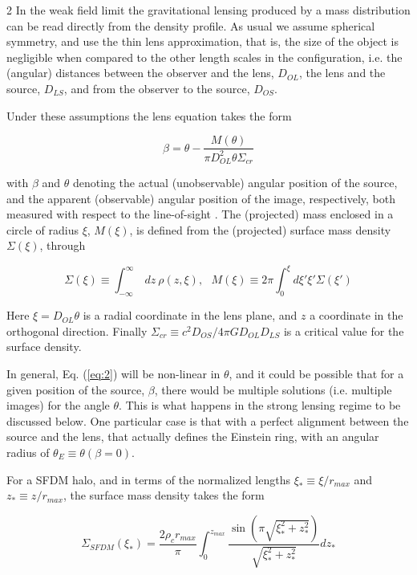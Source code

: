 \documentclass {article}
\begin{document}
\begin {multicols} {2}
In the weak field limit the gravitational lensing produced by a mass distribution can be read directly from the density profile. As usual we assume spherical symmetry, and use the thin lens approximation, that is, the size of the object is negligible when compared to the other
length scales in the configuration, i.e. the (angular) distances between the observer and the lens, $D_{OL}$, the lens and the source, $D_{LS}$, and from the observer to the source, $D_{OS}$.


Under these assumptions the lens equation takes the form

\begin {equation} \label{eq:2}
	\beta = \theta - \frac{M(\theta)}{\pi D_{OL}^2 \theta \Sigma_{cr}}
\end {equation}

with $\beta$ and $\theta$ denoting the actual (unobservable) angular position of the source, and the apparent (observable) angular position of the image, respectively, both measured with respect to the line-of-sight \cite {mollerach2002gravitational}. The (projected) mass enclosed in a circle of radius $\xi$, $M(\xi)$, is defined from the (projected) surface mass density $\Sigma(\xi)$, through

\begin {equation} \label{eq:3}
	\Sigma (\xi) \equiv \int_{-\infty}^{\infty}\ dz\ \rho (z,\xi),\ \ \ M(\xi) \equiv 2\pi \int_0^{\xi} d\xi' \xi' \Sigma (\xi')
\end {equation}

Here $\xi = D_{OL} \theta$ is a radial coordinate in the lens plane, and $z$ a coordinate in the orthogonal direction. Finally $ \Sigma_{cr} \equiv c^2 D_{OS} / 4 \pi G D_{OL} D_{LS} $ is a critical value for the surface density.


In general, Eq. (\ref{eq:2}) will be non-linear in $\theta$, and it could be possible that for a given position of the source, $\beta$, there would be multiple solutions (i.e. multiple images) for the angle $\theta$. This is what happens in the strong lensing regime to be discussed below. One particular case is that with a perfect alignment between the source and the lens, that actually defines the Einstein ring, with an angular radius of $ \theta_E \equiv \theta (\beta = 0) $.


For a SFDM halo, and in terms of the normalized lengths $ \xi_* \equiv \xi / r_{max} $ and $ z_* \equiv z / r_{max} $, the surface mass density takes the form


\begin {equation} \label{eq:4}
	\Sigma_{SFDM} (\xi_*) = \frac {2 \rho_c r_{max} } { \pi} \int_0^{z_{max}} \frac {\sin{(\pi \sqrt{\xi_*^2 + z_*^2})}} {\sqrt{\xi_*^2 + z_*^2}} dz_*
\end {equation}


\end{multicols}
\end{document}
